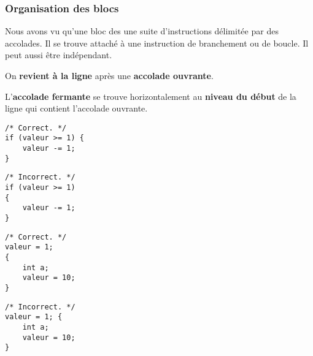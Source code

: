 \begin{frame}[fragile] \frametitle{Organisation des blocs}
Nous avons vu qu'une \alert{bloc} des une suite d'instructions délimitée 
par des accolades. Il se trouve attaché à une instruction de branchement 
ou de boucle. Il peut aussi être indépendant.
\medskip

On {\bf revient à la ligne} après une {\bf accolade ouvrante}.
\medskip

L'{\bf accolade fermante} se trouve horizontalement au {\bf niveau du 
début} de la ligne qui contient l'accolade ouvrante.

\begin{multicols}{2}
\begin{lstlisting}
/* Correct. */
if (valeur >= 1) {
    valeur -= 1;
}
\end{lstlisting}
\bigskip

\begin{lstlisting}
/* Incorrect. */
if (valeur >= 1) 
{
    valeur -= 1;
}
\end{lstlisting}
\end{multicols}

\begin{multicols}{2}
\begin{lstlisting}
/* Correct. */
valeur = 1;
{
    int a;
    valeur = 10;
}
\end{lstlisting}

\begin{lstlisting}
/* Incorrect. */
valeur = 1; {
    int a;
    valeur = 10;
}
\end{lstlisting}

\end{multicols}
\end{frame}

